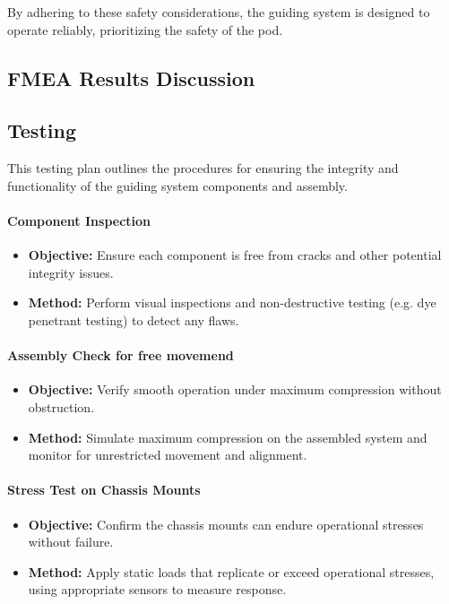 By adhering to these safety considerations, the guiding system is designed to operate reliably, prioritizing the safety of the pod.



\subsection{FMEA Results Discussion}

\subsection{Testing}

This testing plan outlines the procedures for ensuring the integrity and functionality of the guiding system components and assembly.
\paragraph{Component Inspection}
\begin{itemize}
    \item \textbf{Objective:} Ensure each component is free from cracks and other potential integrity issues.
    \item \textbf{Method:} Perform visual inspections and non-destructive testing (e.g.  dye penetrant testing) to detect any flaws.
\end{itemize}

\paragraph{Assembly Check for free movemend}
\begin{itemize}
    \item \textbf{Objective:} Verify smooth operation under maximum compression without obstruction.
    \item \textbf{Method:} Simulate maximum compression on the assembled system and monitor for unrestricted movement and alignment.
\end{itemize}

\paragraph{Stress Test on Chassis Mounts}
\begin{itemize}
    \item \textbf{Objective:} Confirm the chassis mounts can endure operational stresses without failure.
    \item \textbf{Method:} Apply static loads that replicate or exceed operational stresses, using appropriate sensors to measure response.
\end{itemize}


